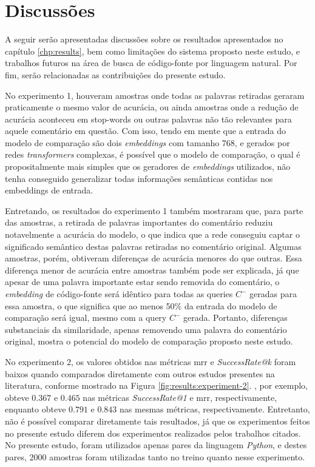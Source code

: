 \chapter{Discussões}
\label{chp:discussions}

A seguir serão apresentadas discussões sobre os resultados apresentados no capítulo \ref{chp:results}, bem como limitações do sistema proposto neste estudo, e trabalhos futuros na área de busca de código-fonte por linguagem natural. Por fim, serão relacionadas as contribuições do presente estudo.

No experimento 1, houveram amostras onde todas as palavras retiradas geraram praticamente o mesmo valor de acurácia, ou ainda amostras onde a redução de acurácia aconteceu em stop-words ou outras palavras não tão relevantes para aquele comentário em questão. Com isso, tendo em mente que a entrada do modelo de comparação são dois \textit{embeddings} com tamanho 768, e gerados por redes \textit{transformers} complexas, é possível que o modelo de comparação, o qual é propositalmente mais simples que os geradores de \textit{embeddings} utilizados, não tenha conseguido generalizar todas informações semânticas contidas nos embeddings de entrada.

Entretando, os resultados do experimento 1 também mostraram que, para parte das amostras, a retirada de palavras importantes do comentário reduziu notavelmente a acurácia do modelo, o que indica que a rede conseguiu captar o significado semântico destas palavras retiradas no comentário original. Algumas amostras, porém, obtiveram diferenças de acurácia menores do que outras. Essa diferença menor de acurácia entre amostras também pode ser explicada, já que apesar de uma palavra importante estar sendo removida do comentário, o \textit{embedding} de código-fonte será idêntico para todas as queries $C^-$ geradas para essa amostra, o que significa que ao menos 50\% da entrada do modelo de comparação será igual, mesmo com a query $C^-$ gerada. Portanto, diferenças substanciais da similaridade, apenas removendo uma palavra do comentário original, mostra o potencial do modelo de comparação proposto neste estudo.

No experimento 2, os valores obtidos nas métricas \gls{mrr} e \textit{SuccessRate@k} foram baixos quando comparados diretamente com outros estudos presentes na literatura, conforme mostrado na Figura \ref{fig:results:experiment-2}. \textcite{Gu2018DeepCS}, por exemplo, obteve $0.367$ e $0.465$ nas métricas \textit{SuccessRate@1} e \gls{mrr}, respectivamente, enquanto \textcite{Gu2021CRaDLeDC} obteve $0.791$ e $0.843$ nas mesmas métricas, respectivamente. Entretanto, não é possível comparar diretamente tais resultados, já que os experimentos feitos no presente estudo diferem dos experimentos realizados pelos trabalhos citados. No presente estudo, foram utilizados apenas pares da linguagem \textit{Python}, e destes pares, 2000 amostras foram utilizadas tanto no treino quanto nesse experimento.

